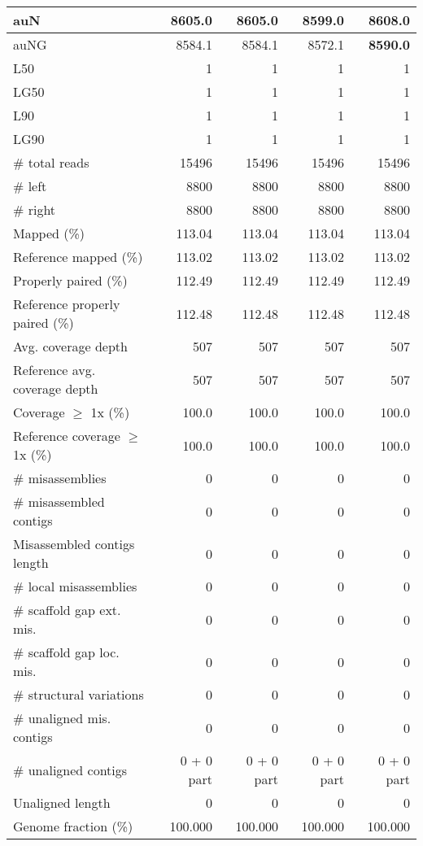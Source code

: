 \documentclass[12pt,a4paper]{article}
\begin{document}
\begin{table}[ht]
\begin{center}
\begin{tabular}{|l*{4}{|r}|}
auN & 8605.0 & 8605.0 & 8599.0 & {\bf 8608.0} \\ \hline
auNG & 8584.1 & 8584.1 & 8572.1 & {\bf 8590.0} \\ \hline
L50 & 1 & 1 & 1 & 1 \\ \hline
LG50 & 1 & 1 & 1 & 1 \\ \hline
L90 & 1 & 1 & 1 & 1 \\ \hline
LG90 & 1 & 1 & 1 & 1 \\ \hline
\# total reads & 15496 & 15496 & 15496 & 15496 \\ \hline
\# left & 8800 & 8800 & 8800 & 8800 \\ \hline
\# right & 8800 & 8800 & 8800 & 8800 \\ \hline
Mapped (\%) & 113.04 & 113.04 & 113.04 & 113.04 \\ \hline
Reference mapped (\%) & 113.02 & 113.02 & 113.02 & 113.02 \\ \hline
Properly paired (\%) & 112.49 & 112.49 & 112.49 & 112.49 \\ \hline
Reference properly paired (\%) & 112.48 & 112.48 & 112.48 & 112.48 \\ \hline
Avg. coverage depth & 507 & 507 & 507 & 507 \\ \hline
Reference avg. coverage depth & 507 & 507 & 507 & 507 \\ \hline
Coverage $\geq$ 1x (\%) & 100.0 & 100.0 & 100.0 & 100.0 \\ \hline
Reference coverage $\geq$ 1x (\%) & 100.0 & 100.0 & 100.0 & 100.0 \\ \hline
\# misassemblies & 0 & 0 & 0 & 0 \\ \hline
\# misassembled contigs & 0 & 0 & 0 & 0 \\ \hline
Misassembled contigs length & 0 & 0 & 0 & 0 \\ \hline
\# local misassemblies & 0 & 0 & 0 & 0 \\ \hline
\# scaffold gap ext. mis. & 0 & 0 & 0 & 0 \\ \hline
\# scaffold gap loc. mis. & 0 & 0 & 0 & 0 \\ \hline
\# structural variations & 0 & 0 & 0 & 0 \\ \hline
\# unaligned mis. contigs & 0 & 0 & 0 & 0 \\ \hline
\# unaligned contigs & 0 + 0 part & 0 + 0 part & 0 + 0 part & 0 + 0 part \\ \hline
Unaligned length & 0 & 0 & 0 & 0 \\ \hline
Genome fraction (\%) & 100.000 & 100.000 & 100.000 & 100.000 \\ \hline

\end{tabular}
\end{center}
\end{table}
\end{document}
